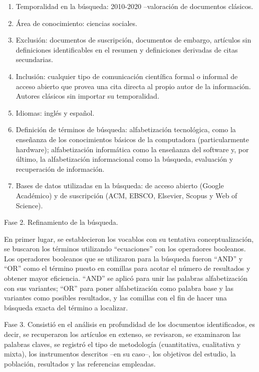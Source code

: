 \documentclass[spanish]{textolivre}
\begin{document}
\begin{enumerate}[label={\alph*}]
    \item Temporalidad en la búsqueda: 2010-2020 –valoración de documentos clásicos.
    \item Área de conocimiento: ciencias sociales.
    \item Exclusión: documentos de suscripción, documentos de embargo, artículos sin definiciones identificables en el resumen y definiciones derivadas de citas secundarias.
    \item Inclusión: cualquier tipo de comunicación científica formal o informal de acceso abierto que provea una cita directa al propio autor de la información. Autores clásicos sin importar su temporalidad.
    \item Idiomas: inglés y español.
    \item Definición de términos de búsqueda: alfabetización tecnológica, como la enseñanza de los conocimientos básicos de la computadora (particularmente hardware); alfabetización informática como la enseñanza del software y, por último, la alfabetización informacional como la búsqueda, evaluación y recuperación de información. 
    \item Bases de datos utilizadas en la búsqueda: de acceso abierto (Google Académico) y de suscripción (ACM, EBSCO, Elsevier, Scopus y Web of Science). 
\end{enumerate}

Fase 2. Refinamiento de la búsqueda.

En primer lugar, se establecieron los vocablos con su tentativa conceptualización, se buscaron los términos utilizando “ecuaciones” con los operadores booleanos. Los operadores booleanos que se utilizaron para la búsqueda fueron “AND” y “OR” como el término puesto en comillas para acotar el número de resultados y obtener mayor eficiencia. “AND” se aplicó para unir las palabras alfabetización con sus variantes; “OR” para poner alfabetización como palabra base y las variantes como posibles resultados, y las comillas con el fin de hacer una búsqueda exacta del término a localizar.

Fase 3. Consistió en el análisis en profundidad de los documentos identificados, es decir, se recuperaron los artículos en extenso, se revisaron, se examinaron las palabras claves, se registró el tipo de metodología (cuantitativa, cualitativa y mixta), los instrumentos descritos –en su caso–, los objetivos del estudio, la población, resultados y las referencias empleadas.
\end{document}
